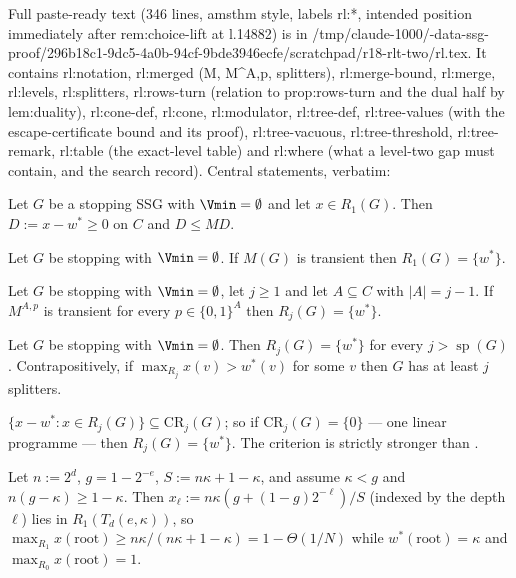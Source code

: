 Full paste-ready text (346 lines, amsthm style, labels rl:*, intended position immediately after rem:choice-lift at l.14882) is in /tmp/claude-1000/-data-ssg-proof/296b18c1-9dc5-4a0b-94cf-9bde3946ecfe/scratchpad/r18-rlt-two/rl.tex. It contains rl:notation, rl:merged (M, M^{A,p}, splitters), rl:merge-bound, rl:merge, rl:levels, rl:splitters, rl:rows-turn (relation to prop:rows-turn and the dual half by lem:duality), rl:cone-def, rl:cone, rl:modulator, rl:tree-def, rl:tree-values (with the escape-certificate bound and its proof), rl:tree-vacuous, rl:tree-threshold, rl:tree-remark, rl:table (the exact-level table) and rl:where (what a level-two gap must contain, and the search record). Central statements, verbatim:

\begin{lemma}\label{rl:merge-bound}
Let $G$ be a stopping SSG with $\Vmin=\emptyset$ and let $x\in R_1(G)$. Then $D:=x-w^{\ast}\ge0$ on $C$ and $D\le MD$.
\end{lemma}

\begin{theorem}\label{rl:merge}
Let $G$ be stopping with $\Vmin=\emptyset$. If $M(G)$ is transient then $R_1(G)=\{w^{\ast}\}$.
\end{theorem}

\begin{theorem}\label{rl:levels}
Let $G$ be stopping with $\Vmin=\emptyset$, let $j\ge1$ and let $A\subseteq C$ with $|A|=j-1$. If $M^{A,p}$ is transient for every $p\in\{0,1\}^{A}$ then $R_j(G)=\{w^{\ast}\}$.
\end{theorem}

\begin{corollary}\label{rl:splitters}
Let $G$ be stopping with $\Vmin=\emptyset$. Then $R_j(G)=\{w^{\ast}\}$ for every $j>\operatorname{sp}(G)$. Contrapositively, if $\max_{R_j}x(v)>w^{\ast}(v)$ for some $v$ then $G$ has at least $j$ splitters.
\end{corollary}

\begin{proposition}\label{rl:cone}
$\{x-w^{\ast}:x\in R_j(G)\}\subseteq\mathrm{CR}_j(G)$; so if $\mathrm{CR}_j(G)=\{0\}$ --- one linear programme --- then $R_j(G)=\{w^{\ast}\}$. The criterion is strictly stronger than .
\end{proposition}

\begin{theorem}\label{rl:tree-vacuous}
Let $n:=2^{d}$, $g=1-2^{-e}$, $S:=n\kappa+1-\kappa$, and assume $\kappa<g$ and $n(g-\kappa)\ge1-\kappa$. Then $x_\ell:=n\kappa(g+(1-g)2^{-\ell})/S$ (indexed by the depth $\ell$) lies in $R_1(T_d(e,\kappa))$, so $\max_{R_1}x(\mathrm{root})\ge n\kappa/(n\kappa+1-\kappa)=1-\Theta(1/N)$ while $w^{\ast}(\mathrm{root})=\kappa$ and $\max_{R_0}x(\mathrm{root})=1$.
\end{theorem}

